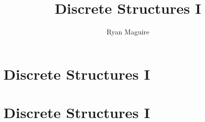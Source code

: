 \documentclass[crop=false,class=book,oneside]{standalone}
\begin{document}
    \ifx\ifmain\undefined
        \title{Discrete Structures I}
        \author{Ryan Maguire}
        \date{\vspace{-5ex}}
        \maketitle
        \tableofcontents
        \clearpage
        \chapter*{Discrete Structures I}
        \vspace{10ex}
        \setcounter{chapter}{1}
    \else
        \chapter{Discrete Structures I}
    \fi
\end{document}
